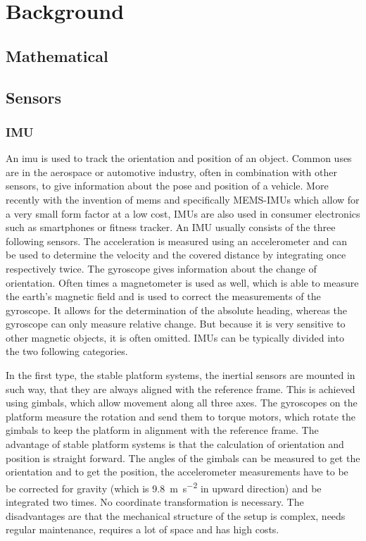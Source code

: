 \chapter{Background}
\label{ch:Background}
\section{Mathematical}

\section{Sensors}
\subsection{IMU}
An \gls{imu} is used to track the orientation and position of an object.
Common uses are in the aerospace or automotive industry, often in combination with other sensors, to give information about the pose and position of a vehicle.
More recently with the invention of \gls{mems} and specifically MEMS-IMUs which allow for a very small form factor at a low cost, IMUs are also used in consumer electronics such as smartphones or fitness tracker.
An IMU usually consists of the three following sensors.
The acceleration is measured using an accelerometer and can be used to determine the velocity and the covered distance by integrating once respectively twice.
The gyroscope gives information about the change of orientation.
Often times a magnetometer is used as well, which is able to measure the earth's magnetic field and is used to correct the measurements of the gyroscope.
It allows for the determination of the absolute heading, whereas the gyroscope can only measure relative change. But because it is very sensitive to other magnetic objects, it is often omitted.
IMUs can be typically divided into the two following categories.

In the first type, the stable platform systems, the inertial sensors are mounted in such way, that they are always aligned with the reference frame.
This is achieved using gimbals, which allow movement along all three axes.
The gyroscopes on the platform measure the rotation and send them to torque motors, which rotate the gimbals to keep the platform in alignment with the reference frame.
The advantage of stable platform systems is that the calculation of orientation and position is straight forward.
The angles of the gimbals can be measured to get the orientation and to get the position, the accelerometer measurements have to be be corrected for gravity (which is \SI{9.8}{\metre\per\second^2} in upward direction) and be integrated two times.
No coordinate transformation is necessary.
The disadvantages are that the mechanical structure of the setup is complex, needs regular maintenance, requires a lot of space and has high costs.

